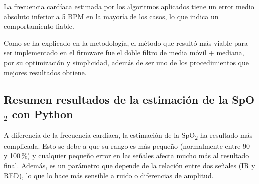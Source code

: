 \begin{table}[H]
\centering
{}
\caption{Estimación de frecuencia cardíaca con error relativo corregido, correspondiente al archivo \texttt{temporal\_fft.ipynb.}}
\label{tabla:fc_temporal_fft_error}
\end{table}



La frecuencia cardíaca estimada por los algoritmos aplicados tiene un error medio absoluto inferior a 5 BPM en la mayoría de los casos, lo que indica un comportamiento fiable.

Como se ha explicado en la metodología, el método que resultó más viable para ser implementado en el firmware fue el doble filtro de media móvil + mediana, por su optimización y simplicidad, además de ser uno de los procedimientos que mejores resultados obtiene.

\subsection{Resumen resultados de la estimación de la SpO$_2$ con Python}

A diferencia de la frecuencia cardíaca, la estimación de la SpO\textsubscript{2} ha resultado más complicada. Esto se debe a que su rango es más pequeño (normalmente entre 90 y 100\,\%) y cualquier pequeño error en las señales afecta mucho más al resultado final. Además, es un parámetro que depende de la relación entre dos señales (IR y RED), lo que lo hace más sensible a ruido o diferencias de amplitud.

